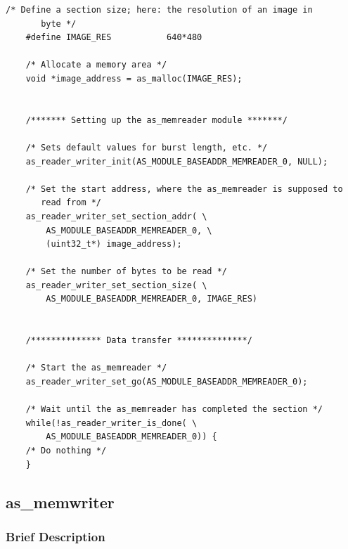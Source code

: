 \begin{footnotesize}
    \begin{lstlisting}[label=lst:memreader_setup]
    /* Define a section size; here: the resolution of an image in 
       byte */ 
    #define IMAGE_RES           640*480
    
    /* Allocate a memory area */
    void *image_address = as_malloc(IMAGE_RES);
    
    
    /******* Setting up the as_memreader module *******/
    
    /* Sets default values for burst length, etc. */
    as_reader_writer_init(AS_MODULE_BASEADDR_MEMREADER_0, NULL);
    
    /* Set the start address, where the as_memreader is supposed to 
       read from */
    as_reader_writer_set_section_addr( \
        AS_MODULE_BASEADDR_MEMREADER_0, \
        (uint32_t*) image_address);
    
    /* Set the number of bytes to be read */
    as_reader_writer_set_section_size( \
        AS_MODULE_BASEADDR_MEMREADER_0, IMAGE_RES)
    
    
    /************** Data transfer **************/
    
    /* Start the as_memreader */
    as_reader_writer_set_go(AS_MODULE_BASEADDR_MEMREADER_0);
    
    /* Wait until the as_memreader has completed the section */
    while(!as_reader_writer_is_done( \
        AS_MODULE_BASEADDR_MEMREADER_0)) {
    /* Do nothing */
    }
    \end{lstlisting}
\end{footnotesize}


\subsection{as\_memwriter} \label{ch:07-basic-mods-in_out-memwriter}


\subsubsection{Brief Description}

